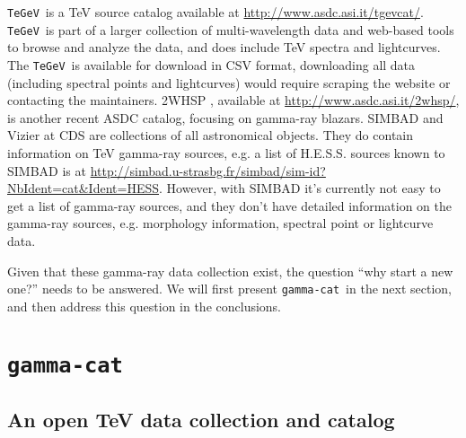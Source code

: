 \documentclass[11pt,twoside]{article}
\newcommand{\gammacat}{\texttt{gamma-cat}}
\newcommand{\tegev}{\texttt{TeGeV}}
\newcommand{\tgevcaturl}{\url{http://www.asdc.asi.it/tgevcat/}}
\newcommand{\whsp}{\url{http://www.asdc.asi.it/2whsp/}}
\newcommand{\simbadhess}{\url{http://simbad.u-strasbg.fr/simbad/sim-id?NbIdent=cat&Ident=HESS}}
\begin{document}
\tegev\ is a TeV source catalog \citep{tgevcat} available at \tgevcaturl.
\tegev\ is part of a larger collection of multi-wavelength data and web-based
tools to browse and analyze the data, and does include TeV spectra and
lightcurves. The \tegev\ is available for download in CSV format, downloading
all data (including spectral points and lightcurves) would require scraping the
website or contacting the maintainers. 2WHSP \citep{whsp}, available at \whsp,
is another recent ASDC catalog, focusing on gamma-ray blazars. SIMBAD and Vizier at CDS are collections of all astronomical objects. They do contain information on TeV gamma-ray sources, e.g. a list of H.E.S.S. sources known to SIMBAD is at \simbadhess. However, with SIMBAD it's currently not easy to get a list of gamma-ray sources, and they don't have detailed information on the gamma-ray sources, e.g. morphology information, spectral point or lightcurve data.

Given that these gamma-ray data collection exist, the question ``why start a new one?'' needs to be answered. We will first present \gammacat\ in the next section, and then address this question in the conclusions.

\section{\gammacat}
\label{sec:gammacat}

\subsection{An open TeV data collection and catalog}
\end{document}
